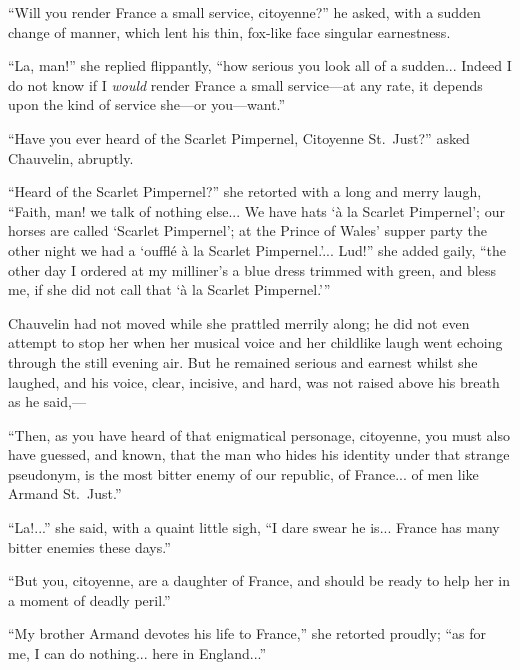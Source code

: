 \documentclass[paper=a5,BCOR=7mm,twoside,DIV=calc,12pt,usegeometry,chapterprefix,endperiod,headings=big]{scrbook}
\begin{document}
\enquote{Will you render France a small service, citoyenne?} he asked, with a sudden change of manner, which lent his thin, fox-like face singular earnestness.

\enquote{La, man!} she replied flippantly, \enquote{how serious you look all of a sudden... Indeed I do not know if I \textit{would} render France a small service---at any rate, it depends upon the kind of service she---or you---want.}

\enquote{Have you ever heard of the Scarlet Pimpernel, Citoyenne St.~Just?} asked Chauvelin, abruptly.

\enquote{Heard of the Scarlet Pimpernel?} she retorted with a long and merry laugh, \enquote{Faith, man! we talk of nothing else... We have hats \enquote{à la Scarlet Pimpernel}; our horses are called \enquote{Scarlet Pimpernel}; at the Prince of Wales’ supper party the other night we had a \enquote{oufflé à la Scarlet Pimpernel.}... Lud!} she added gaily, \enquote{the other day I ordered at my milliner's a blue dress trimmed with green, and bless me, if she did not call that \enquote{à la Scarlet Pimpernel.}}

Chauvelin had not moved while she prattled merrily along; he did not even attempt to stop her when her musical voice and her childlike laugh went echoing through the still evening air. But he remained serious and earnest whilst she laughed, and his voice, clear, incisive, and hard, was not raised above his breath as he said,---

\enquote{Then, as you have heard of that enigmatical personage, citoyenne, you must also have guessed, and known, that the man who hides his identity under that strange pseudonym, is the most bitter enemy of our republic, of France... of men like Armand St.~Just.}

\enquote{La!...} she said, with a quaint little sigh, \enquote{I dare swear he is... France has many bitter enemies these days.}

\enquote{But you, citoyenne, are a daughter of France, and should be ready to help her in a moment of deadly peril.}

\enquote{My brother Armand devotes his life to France,} she retorted proudly; \enquote{as for me, I can do nothing... here in England...}
\end{document}
